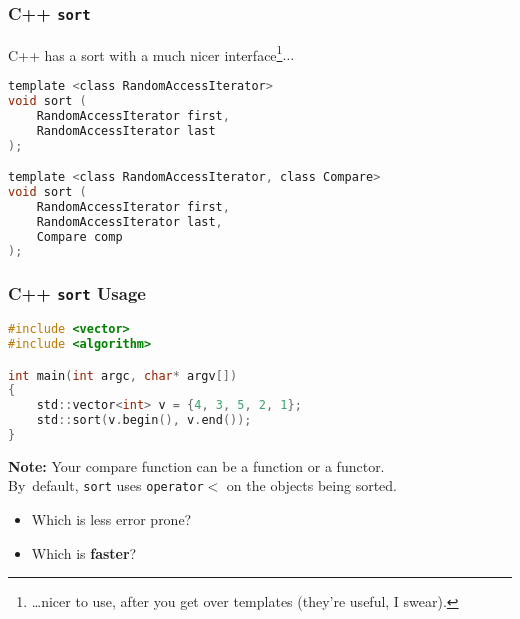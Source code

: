 \begin{frame}[fragile]
  \frametitle{C++ {\tt sort}}

  
  C++ has a sort with a much nicer interface\footnote{\ldots nicer to use, after you get over templates (they're useful, I swear).}$\ldots$

  \begin{lstlisting}[language=C]
template <class RandomAccessIterator>
void sort (
    RandomAccessIterator first,
    RandomAccessIterator last
);

template <class RandomAccessIterator, class Compare>
void sort (
    RandomAccessIterator first,
    RandomAccessIterator last,
    Compare comp
);
  \end{lstlisting}
  
\end{frame}


\begin{frame}[fragile]
  \frametitle{C++ {\tt sort} Usage}

  
  \begin{lstlisting}[language=C]
#include <vector>
#include <algorithm>

int main(int argc, char* argv[])
{
    std::vector<int> v = {4, 3, 5, 2, 1};
    std::sort(v.begin(), v.end());
}
  \end{lstlisting}
  \vfill

  {\bf Note:} Your compare function can be a function or a functor. \\By~default,
  {\tt sort} uses {\tt operator$<$} on the objects being sorted.

  \begin{itemize}
    \item Which is less error prone?
    \item Which is {\bf faster}?
  \end{itemize}
  
\end{frame}

